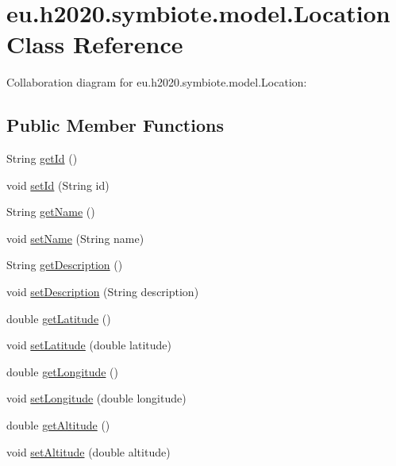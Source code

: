 \hypertarget{classeu_1_1h2020_1_1symbiote_1_1model_1_1Location}{}\section{eu.\+h2020.\+symbiote.\+model.\+Location Class Reference}
\label{classeu_1_1h2020_1_1symbiote_1_1model_1_1Location}


Collaboration diagram for eu.\+h2020.\+symbiote.\+model.\+Location\+:
\subsection*{Public Member Functions}
\begin{DoxyCompactItemize}
\item 
String \hyperlink{classeu_1_1h2020_1_1symbiote_1_1model_1_1Location_a98a3b93d177deb7b9630c5e37547d80d}{get\+Id} ()
\item 
void \hyperlink{classeu_1_1h2020_1_1symbiote_1_1model_1_1Location_a308f71eeeed57f22b5996da217028d29}{set\+Id} (String id)
\item 
String \hyperlink{classeu_1_1h2020_1_1symbiote_1_1model_1_1Location_a78e563a2622952f37da6f571932afa23}{get\+Name} ()
\item 
void \hyperlink{classeu_1_1h2020_1_1symbiote_1_1model_1_1Location_a67ddf61270deeb669ebcdce9b9ead998}{set\+Name} (String name)
\item 
String \hyperlink{classeu_1_1h2020_1_1symbiote_1_1model_1_1Location_accf0bb0ab10306a962e09fc32c8d821c}{get\+Description} ()
\item 
void \hyperlink{classeu_1_1h2020_1_1symbiote_1_1model_1_1Location_a45d3f8f4397791af93669578501a43bf}{set\+Description} (String description)
\item 
double \hyperlink{classeu_1_1h2020_1_1symbiote_1_1model_1_1Location_a40812abe56323ccb3e65d1309d2d55e4}{get\+Latitude} ()
\item 
void \hyperlink{classeu_1_1h2020_1_1symbiote_1_1model_1_1Location_a26b8aab258d4422bd5fc64d7a512b685}{set\+Latitude} (double latitude)
\item 
double \hyperlink{classeu_1_1h2020_1_1symbiote_1_1model_1_1Location_afe9ac4993b9dbcc9350e2667e279d39b}{get\+Longitude} ()
\item 
void \hyperlink{classeu_1_1h2020_1_1symbiote_1_1model_1_1Location_a6bc9a04947915ea52001bccbcba0849e}{set\+Longitude} (double longitude)
\item 
double \hyperlink{classeu_1_1h2020_1_1symbiote_1_1model_1_1Location_a333c37abcd3c9ea766ca5ec6dddd5e3a}{get\+Altitude} ()
\item 
void \hyperlink{classeu_1_1h2020_1_1symbiote_1_1model_1_1Location_ac2fc6d59229ad7253416f2fdf650675d}{set\+Altitude} (double altitude)
\end{DoxyCompactItemize}


